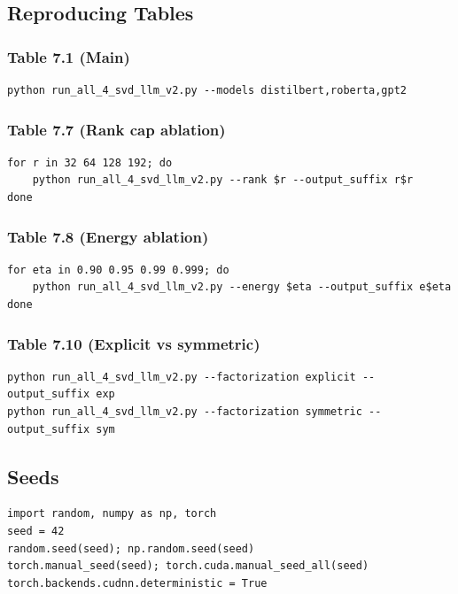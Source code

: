 \subsection{Reproducing Tables}

\subsubsection{Table 7.1 (Main)}
\begin{lstlisting}
python run_all_4_svd_llm_v2.py --models distilbert,roberta,gpt2
\end{lstlisting}

\subsubsection{Table 7.7 (Rank cap ablation)}
\begin{lstlisting}
for r in 32 64 128 192; do
    python run_all_4_svd_llm_v2.py --rank $r --output_suffix r$r
done
\end{lstlisting}

\subsubsection{Table 7.8 (Energy ablation)}
\begin{lstlisting}
for eta in 0.90 0.95 0.99 0.999; do
    python run_all_4_svd_llm_v2.py --energy $eta --output_suffix e$eta
done
\end{lstlisting}

\subsubsection{Table 7.10 (Explicit vs symmetric)}
\begin{lstlisting}
python run_all_4_svd_llm_v2.py --factorization explicit --output_suffix exp
python run_all_4_svd_llm_v2.py --factorization symmetric --output_suffix sym
\end{lstlisting}

\subsection{Seeds}

\begin{lstlisting}
import random, numpy as np, torch
seed = 42
random.seed(seed); np.random.seed(seed)
torch.manual_seed(seed); torch.cuda.manual_seed_all(seed)
torch.backends.cudnn.deterministic = True
\end{lstlisting}

